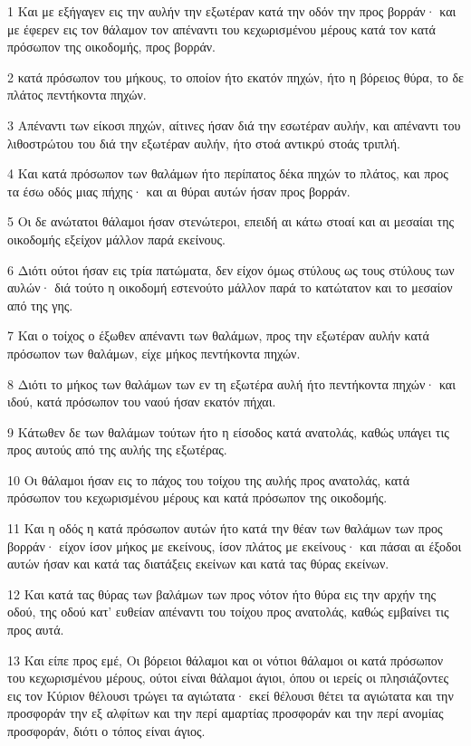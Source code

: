 \par 1 Και με εξήγαγεν εις την αυλήν την εξωτέραν κατά την οδόν την προς βορράν· και με έφερεν εις τον θάλαμον τον απέναντι του κεχωρισμένου μέρους κατά τον κατά πρόσωπον της οικοδομής, προς βορράν.
\par 2 κατά πρόσωπον του μήκους, το οποίον ήτο εκατόν πηχών, ήτο η βόρειος θύρα, το δε πλάτος πεντήκοντα πηχών.
\par 3 Απέναντι των είκοσι πηχών, αίτινες ήσαν διά την εσωτέραν αυλήν, και απέναντι του λιθοστρώτου του διά την εξωτέραν αυλήν, ήτο στοά αντικρύ στοάς τριπλή.
\par 4 Και κατά πρόσωπον των θαλάμων ήτο περίπατος δέκα πηχών το πλάτος, και προς τα έσω οδός μιας πήχης· και αι θύραι αυτών ήσαν προς βορράν.
\par 5 Οι δε ανώτατοι θάλαμοι ήσαν στενώτεροι, επειδή αι κάτω στοαί και αι μεσαίαι της οικοδομής εξείχον μάλλον παρά εκείνους.
\par 6 Διότι ούτοι ήσαν εις τρία πατώματα, δεν είχον όμως στύλους ως τους στύλους των αυλών· διά τούτο η οικοδομή εστενούτο μάλλον παρά το κατώτατον και το μεσαίον από της γης.
\par 7 Και ο τοίχος ο έξωθεν απέναντι των θαλάμων, προς την εξωτέραν αυλήν κατά πρόσωπον των θαλάμων, είχε μήκος πεντήκοντα πηχών.
\par 8 Διότι το μήκος των θαλάμων των εν τη εξωτέρα αυλή ήτο πεντήκοντα πηχών· και ιδού, κατά πρόσωπον του ναού ήσαν εκατόν πήχαι.
\par 9 Κάτωθεν δε των θαλάμων τούτων ήτο η είσοδος κατά ανατολάς, καθώς υπάγει τις προς αυτούς από της αυλής της εξωτέρας.
\par 10 Οι θάλαμοι ήσαν εις το πάχος του τοίχου της αυλής προς ανατολάς, κατά πρόσωπον του κεχωρισμένου μέρους και κατά πρόσωπον της οικοδομής.
\par 11 Και η οδός η κατά πρόσωπον αυτών ήτο κατά την θέαν των θαλάμων των προς βορράν· είχον ίσον μήκος με εκείνους, ίσον πλάτος με εκείνους· και πάσαι αι έξοδοι αυτών ήσαν και κατά τας διατάξεις εκείνων και κατά τας θύρας εκείνων.
\par 12 Και κατά τας θύρας των βαλάμων των προς νότον ήτο θύρα εις την αρχήν της οδού, της οδού κατ' ευθείαν απέναντι του τοίχου προς ανατολάς, καθώς εμβαίνει τις προς αυτά.
\par 13 Και είπε προς εμέ, Οι βόρειοι θάλαμοι και οι νότιοι θάλαμοι οι κατά πρόσωπον του κεχωρισμένου μέρους, ούτοι είναι θάλαμοι άγιοι, όπου οι ιερείς οι πλησιάζοντες εις τον Κύριον θέλουσι τρώγει τα αγιώτατα· εκεί θέλουσι θέτει τα αγιώτατα και την προσφοράν την εξ αλφίτων και την περί αμαρτίας προσφοράν και την περί ανομίας προσφοράν, διότι ο τόπος είναι άγιος.
